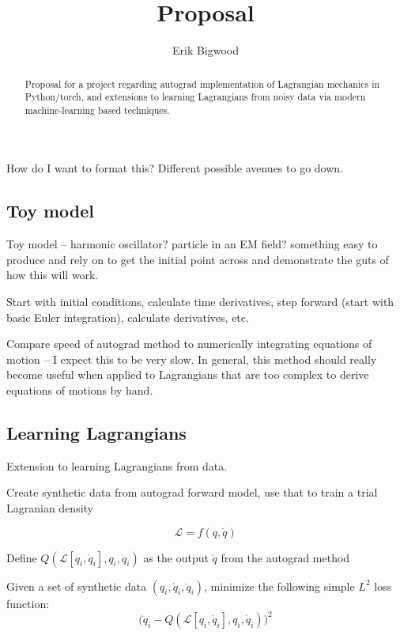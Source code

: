 \documentclass[]{article}
\title{Proposal}
\author{Erik Bigwood}
\begin{document}
\maketitle

\begin{abstract}
	Proposal for a project regarding autograd implementation of Lagrangian mechanics in Python/torch, and extensions to learning Lagrangians from noisy data via modern machine-learning based techniques.
\end{abstract}

\section{}
How do I want to format this? Different possible avenues to go down.

\subsection{Toy model}
Toy model -- harmonic oscillator? particle in an EM field? something easy to produce and rely on to get the initial point across and demonstrate the guts of how this will work.

Start with initial conditions, calculate time derivatives, step forward (start with basic Euler integration), calculate derivatives, etc.

Compare speed of autograd method to numerically integrating equations of motion -- I expect this to be very slow.
In general, this method should really become useful when applied to Lagrangians that are too complex to derive equations of motions by hand.

\subsection{Learning Lagrangians}
Extension to learning Lagrangians from data.

Create synthetic data from autograd forward model, use that to train a trial Lagranian density

\begin{equation}
	\mathcal{L} = f(q,\dot{q})
\end{equation}

Define $Q(\mathcal{L}[q_i,\dot{q}_i],q_i,\dot{q}_i)$ as the output $\ddot{q}$ from the autograd method

Given a set of synthetic data $(q_i, \dot{q}_i,\ddot{q}_i)$, minimize the following simple $L^2$ loss function:
\begin{equation}
	\Big(\ddot{q}_i - Q( \mathcal{L}[q_i,\dot{q}_i],q_i,\dot{q}_i)\Big)^2
\end{equation}
\end{document}

